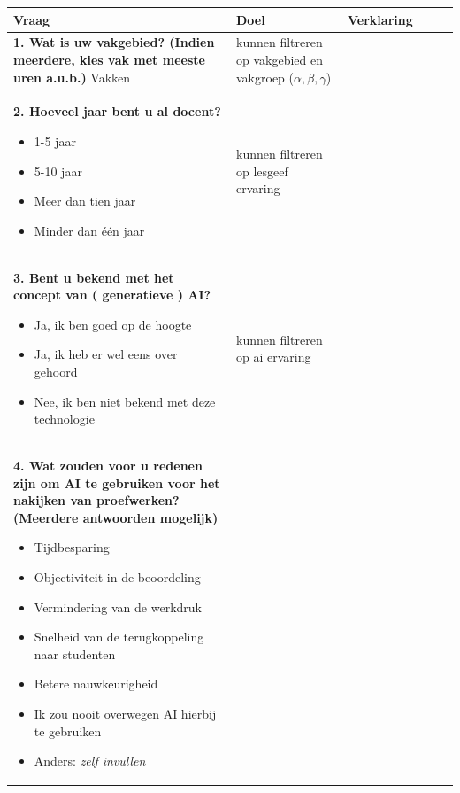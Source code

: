 \documentclass[12pt]{article}
\begin{document}
\begin{longtable}{p{0.5\linewidth}|p{0.25\linewidth}|p{0.25\linewidth}}
    Vraag & Doel & Verklaring \\
    \endhead
    \hline 
    \begin{minipage}[t]{\linewidth}
        \textbf{1. Wat is uw vakgebied? (Indien meerdere, kies vak met meeste uren a.u.b.) }
        \hspace{4em} Vakken        
    \end{minipage} & kunnen filtreren op vakgebied en vakgroep ($\alpha, \beta, \gamma$) & \\
    \hline 
    \begin{minipage}[t]{\linewidth}
        \textbf{2. Hoeveel jaar bent u al docent? }
        \begin{itemize}
            \item 1-5 jaar
            \item 5-10 jaar
            \item Meer dan tien jaar
            \item Minder dan één jaar
        \end{itemize}
    \end{minipage} & kunnen filtreren op lesgeef ervaring & \\
    \hline 
    \begin{minipage}[t]{\linewidth}
        \textbf{3. Bent u bekend met het concept van ( generatieve ) AI? }
        \begin{itemize}
            \item Ja, ik ben goed op de hoogte
            \item Ja, ik heb er wel eens over gehoord
            \item Nee, ik ben niet bekend met deze technologie
        \end{itemize}
    \end{minipage} & kunnen filtreren op ai ervaring & \\
    \hline 
    \begin{minipage}[t]{\linewidth}
        \textbf{4. Wat zouden voor u redenen zijn om AI te gebruiken voor het nakijken van proefwerken? (Meerdere antwoorden mogelijk) }
        \begin{itemize}
            \item Tijdbesparing
            \item Objectiviteit in de beoordeling
            \item Vermindering van de werkdruk
            \item Snelheid van de terugkoppeling naar studenten
            \item Betere nauwkeurigheid
            \item Ik zou nooit overwegen AI hierbij te gebruiken
            \item Anders: \textit{zelf invullen}


\end{itemize}
\end{minipage}
\end{longtable}
\end{document}
